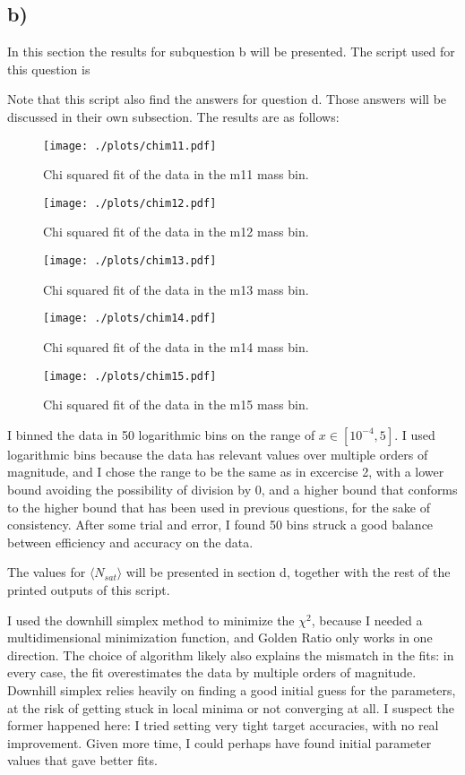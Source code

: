 \subsection*{b)}
In this section the results for subquestion b will be presented. The script used for this question is 

Note that this script also find the answers for question d. Those answers will be discussed in their own subsection.
The results are as follows:
\begin{figure}[!h]
    \centering
    \texttt{[image: ./plots/chim11.pdf]}
    \caption{Chi squared fit of the data in the m11 mass bin.}
    \label{fig:chim11}
\end{figure}

\begin{figure}[!h]
    \centering
    \texttt{[image: ./plots/chim12.pdf]}
    \caption{Chi squared fit of the data in the m12 mass bin.}
    \label{fig:chim12}
\end{figure}

\begin{figure}[!h]
    \centering
    \texttt{[image: ./plots/chim13.pdf]}
    \caption{Chi squared fit of the data in the m13 mass bin.}
    \label{fig:chim13}
\end{figure}

\begin{figure}[!h]
    \centering
    \texttt{[image: ./plots/chim14.pdf]}
    \caption{Chi squared fit of the data in the m14 mass bin.}
    \label{fig:chim14}
\end{figure}

\begin{figure}[!h]
    \centering
    \texttt{[image: ./plots/chim15.pdf]}
    \caption{Chi squared fit of the data in the m15 mass bin.}
    \label{fig:chim15}
\end{figure}

I binned the data in 50 logarithmic bins on the range of $x \in [ 10^{-4},5]$. I used logarithmic bins because the data has relevant values over multiple orders of magnitude, and I chose the range to be the same as in excercise 2, with a lower bound avoiding the possibility of division by 0, and a higher bound that conforms to the higher bound that has been used in previous questions, for the sake of consistency. After some trial and error, I found 50 bins struck a good balance between efficiency and accuracy on the data.

The values for $\langle N_{sat} \rangle$ will be presented in section d, together with the rest of the printed outputs of this script.

I used the downhill simplex method to minimize the $\chi^2$, because I needed a multidimensional minimization function, and Golden Ratio only works in one direction. The choice of algorithm likely also explains the mismatch in the fits: in every case, the fit overestimates the data by multiple orders of magnitude. Downhill simplex relies heavily on finding a good initial guess for the parameters, at the risk of getting stuck in local minima or not converging at all. I suspect the former happened here: I tried setting very tight target accuracies, with no real improvement. Given more time, I could perhaps have found initial parameter values that gave better fits. 
